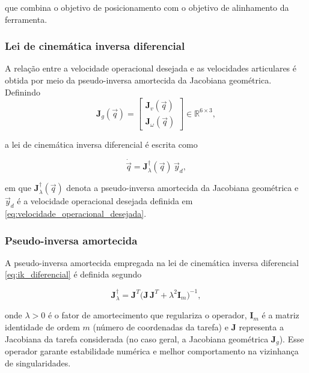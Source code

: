 que combina o objetivo de posicionamento com o objetivo de alinhamento da ferramenta.


\subsubsection{Lei de cinemática inversa diferencial}

A relação entre a velocidade operacional desejada e as velocidades articulares é obtida por meio da pseudo-inversa amortecida da Jacobiana geométrica. Definindo
\begin{equation}
\mathbf{J}_{g}(\vec q)
=
\begin{bmatrix}
\mathbf{J}_{v}(\vec q) \\
\mathbf{J}_{\omega}(\vec q)
\end{bmatrix}
\in \mathbb{R}^{6\times 3},
\end{equation}

a lei de cinemática inversa diferencial é escrita como

\begin{equation}
\label{eq:ik_diferencial}
\dot{\vec{q}}
=
\mathbf{J}_{\lambda}^{\dagger}(\vec q)\,\vec{y}_{d},
\end{equation}

em que $\mathbf{J}_{\lambda}^{\dagger}(\vec q)$ denota a pseudo-inversa amortecida da Jacobiana geométrica e $\vec{y}_{d}$ é a velocidade operacional desejada definida em \eqref{eq:velocidade_operacional_desejada}.


\subsubsection{Pseudo-inversa amortecida}

A pseudo-inversa amortecida empregada na lei de cinemática inversa diferencial \eqref{eq:ik_diferencial} é definida segundo \cite{sciavicco_siciliano2010} 

\begin{equation}
\label{eq:pseudoinversa_amortecida}
\mathbf{J}_{\lambda}^{\dagger}
=
\mathbf{J}^{T}
\bigl(
\mathbf{J}\,\mathbf{J}^{T}
+
\lambda^{2}\mathbf{I}_{m}
\bigr)^{-1},
\end{equation}

onde $\lambda > 0$ é o fator de amortecimento que regulariza o operador, $\mathbf{I}_{m}$ é a matriz identidade de ordem $m$ (número de coordenadas da tarefa) e $\mathbf{J}$ representa a Jacobiana da tarefa considerada (no caso geral, a Jacobiana geométrica $\mathbf{J}_{g}$). Esse operador garante estabilidade numérica e melhor comportamento na vizinhança de singularidades.


